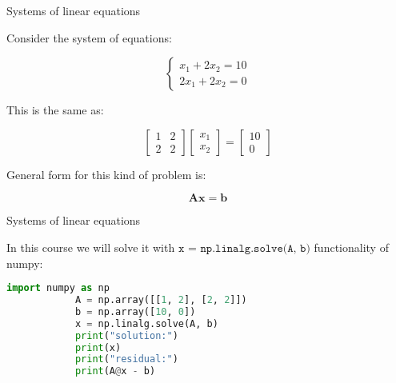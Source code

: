 \documentclass{beamer}
\begin{document}
\begin{frame}{Systems of linear equations}
\begin{flushleft}

Consider the system of equations:

\begin{equation}
	\begin{cases}
		x_1   + 2 x_2 = 10 \\
		2 x_1 + 2 x_2 = 0 
	\end{cases}
\end{equation}

This is the same as:

\begin{equation}
	\begin{bmatrix}
		1   & 2  \\
		2   & 2  
	\end{bmatrix}
	\begin{bmatrix}
		x_1  \\
		x_2 
	\end{bmatrix}
	=
	\begin{bmatrix}
		10  \\
		0 
	\end{bmatrix}
\end{equation}

\bigskip

General form for this kind of problem is:


\begin{equation}
	\mathbf{A} \mathbf{x} = \mathbf{b}
\end{equation}



\end{flushleft}
\end{frame}





\begin{frame}[fragile]{Systems of linear equations}
	\begin{flushleft}
		
		In this course we will solve it with $\texttt{x = np.linalg.solve(A, b)}$ functionality of numpy:
		
		\bigskip
		
		\begin{lstlisting}[language=Python]
			import numpy as np
			A = np.array([[1, 2], [2, 2]])
			b = np.array([10, 0])
			x = np.linalg.solve(A, b)
			print("solution:")
			print(x)
			print("residual:")
			print(A@x - b)
		\end{lstlisting}
		
		
	\end{flushleft}
\end{frame}
\end{document}
